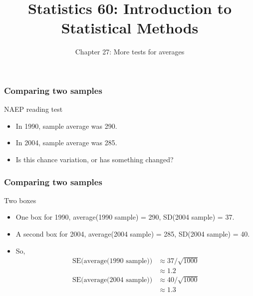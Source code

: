 \documentclass[handout]{beamer}
\title{Statistics 60: Introduction to Statistical Methods}
\subtitle{Chapter 27: More tests for averages}
\author{}%
\begin{document}
   \begin{frame}
   \titlepage
   \end{frame}


   \begin{frame} \frametitle{Comparing two samples}

   \begin{block}
   {NAEP reading test}
   \begin{itemize}
   \item In 1990, sample average was 290.

   \item In 2004, sample average was 285.

   \item Is this chance variation, or has something changed?

   \end{itemize}
   \end{block}
   \end{frame}


   \begin{frame} \frametitle{Comparing two samples}

   \begin{block}
   {Two boxes}
   \begin{itemize}
   \item One box for 1990, average(1990 sample) = 290, SD(2004 sample) = 37.

   \item A second box for 2004, average(2004 sample) = 285, SD(2004 sample) = 40.

   \item So,
   $$
   \begin{aligned}
   \text{SE(average(1990 sample))} &\approx 37 / \sqrt{1000} \\
    &\approx 1.2\\
   \text{SE(average(2004 sample))} &\approx 40 / \sqrt{1000} \\
   &\approx 1.3\\
   \end{aligned}
   $$

   \end{itemize}
   \end{block}
   \end{frame}

\end{document}

